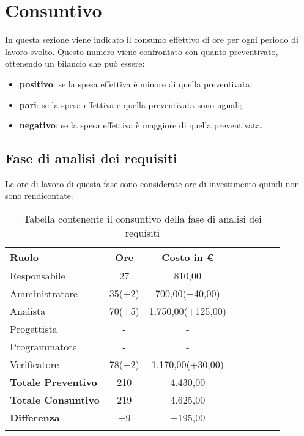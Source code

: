 \section{Consuntivo} \label{_consuntivo}
In questa sezione viene indicato il consumo effettivo di ore per ogni periodo di lavoro svolto. Questo numero viene confrontato con quanto preventivato, ottenendo un bilancio che può essere:
\begin{itemize}
	\item \textbf{positivo}: se la spesa effettiva è minore di quella preventivata;
	\item \textbf{pari}: se la spesa effettiva e quella preventivata sono uguali;
	\item \textbf{negativo}:  se la spesa effettiva è maggiore di quella preventivata.
\end{itemize}

\subsection{Fase di analisi dei requisiti} \label{_consuntivoAnalisiDeiRequisiti}
Le ore di lavoro di questa fase sono considerate ore di investimento quindi non sono rendicontate.

\begin{longtable}{|l|c|c|c|c|c|c|c|}
	\hline
	\rowcolor{lighter-grayer}
	\textbf{Ruolo}             & \textbf{Ore} & \textbf{Costo in €} \\
	\hline
	\endfirsthead

	\hline
	Responsabile               & 27           & 810,00              \\
	\hline
	\hline
	Amministratore             & 35(+2)       & 700,00(+40,00)      \\
	\hline
	\hline
	Analista                   & 70(+5)       & 1.750,00(+125,00)   \\
	\hline
	\hline
	Progettista                & -            & -                   \\
	\hline
	\hline
	Programmatore              & -            & -                   \\
	\hline
	\hline
	Verificatore               & 78(+2)       & 1.170,00(+30,00)    \\
	\hline
	\textbf{Totale Preventivo} & 210          & 4.430,00            \\
	\hline
	\hline
	\textbf{Totale Consuntivo} & 219          & 4.625,00            \\
	\hline
	\hline
	\textbf{Differenza}        & +9           & +195,00             \\
	\hline
	\rowcolor{white}
	\caption{Tabella contenente il consuntivo della fase di analisi dei requisiti}
\end{longtable}
